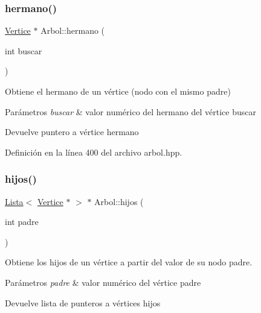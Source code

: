 \subsubsection{\texorpdfstring{hermano()}{hermano()}}
{\footnotesize\ttfamily \hyperlink{classVertice}{Vertice} $\ast$ Arbol\+::hermano (\begin{DoxyParamCaption}\item[{int}]{buscar }\end{DoxyParamCaption})}



Obtiene el hermano de un vértice (nodo con el mismo padre) 


\begin{DoxyParams}{Parámetros}
{\em buscar} & valor numérico del hermano del vértice buscar \\
\hline
\end{DoxyParams}
\begin{DoxyReturn}{Devuelve}
puntero a vértice hermano 
\end{DoxyReturn}


Definición en la línea 400 del archivo arbol.\+hpp.

\mbox{\label{classArbol_ac2bfb4e9bab05342fb7d627fe3916183}} 
\subsubsection{\texorpdfstring{hijos()}{hijos()}\hspace{0.1cm}{\footnotesize\ttfamily [1/2]}}
{\footnotesize\ttfamily \hyperlink{classLista}{Lista}$<$ \hyperlink{classVertice}{Vertice} $\ast$ $>$ $\ast$ Arbol\+::hijos (\begin{DoxyParamCaption}\item[{int}]{padre }\end{DoxyParamCaption})}



Obtiene los hijos de un vértice a partir del valor de su nodo padre. 


\begin{DoxyParams}{Parámetros}
{\em padre} & valor numérico del vértice padre \\
\hline
\end{DoxyParams}
\begin{DoxyReturn}{Devuelve}
lista de punteros a vértices hijos 
\end{DoxyReturn}


